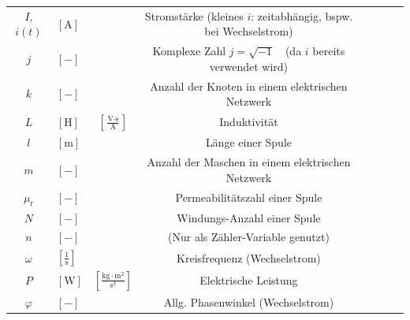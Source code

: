 \begin{raggedright}
\begin{table}[H]
{\begin{tabular}{Sl Sc Sc Sl}
        $I$, $i(t)$                & $\left[\text{A}\right]$                          &                                                             & Stromstärke (kleines $i$: zeitabhängig, bspw. bei Wechselstrom) \\
        $j$                        & $\left[-\right]$                                 &                                                             & Komplexe Zahl $j = \sqrt{-1}$~~(da $i$ bereits verwendet wird) \\
        $k$                        & $\left[-\right]$                                 &                                                             & Anzahl der Knoten in einem elektrischen Netzwerk \\
        $L$                        & $\left[\text{H}\right]$                          & $\left[\tfrac{\text{V}\cdot\text{s}}{\text{A}}\right]$      & Induktivität \\
        $l$                        & $\left[\text{m}\right]$                          &                                                             & Länge einer Spule \\
        $m$                        & $\left[-\right]$                                 &                                                             & Anzahl der Maschen in einem elektrischen Netzwerk \\
        $\mu_\text{r}$             & $\left[-\right]$                                 &                                                             & Permeabilitätszahl einer Spule \\
        $N$                        & $\left[-\right]$                                 &                                                             & Windungs-Anzahl einer Spule \\
        $n$                        & $\left[-\right]$                                 &                                                             & (Nur als Zähler-Variable genutzt) \\
        $\omega$                   & $\left[\tfrac{1}{\text{s}}\right]$               &                                                             & Kreisfrequenz (Wechselstrom) \\
        $P$                        & $\left[\text{W}\right]$                          & $\left[\tfrac{\text{kg}\cdot\text{m}^2}{\text{s}^3}\right]$ & Elektrische Leistung \\
        $\varphi$                  & $\left[-\right]$                                 &                                                             & Allg. Phasenwinkel (Wechselstrom) \\

\end{tabular}}
\end{table}
\end{raggedright}
